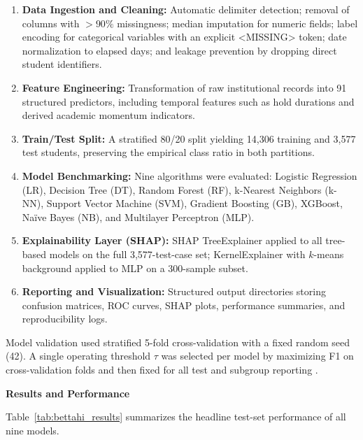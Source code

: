 \documentclass[12pt]{report}
\begin{document}
\begin{enumerate}
    \item \textbf{Data Ingestion and Cleaning:} Automatic delimiter
    detection; removal of columns with $>90\%$ missingness; median
    imputation for numeric fields; label encoding for categorical variables
    with an explicit <MISSING> token; date normalization to
    elapsed days; and leakage prevention by dropping direct student
    identifiers.

    \item \textbf{Feature Engineering:} Transformation of raw institutional
    records into 91 structured predictors, including temporal features such
    as hold durations and derived academic momentum indicators.

    \item \textbf{Train/Test Split:} A stratified 80/20 split yielding
    14,306 training and 3,577 test students, preserving the empirical
    class ratio in both partitions.

    \item \textbf{Model Benchmarking:} Nine algorithms were evaluated:
    Logistic Regression (LR), Decision Tree (DT), Random Forest (RF),
    k-Nearest Neighbors (k-NN), Support Vector Machine (SVM), Gradient
    Boosting (GB), XGBoost, Na\"{i}ve Bayes (NB), and Multilayer
    Perceptron (MLP).

    \item \textbf{Explainability Layer (SHAP):} SHAP TreeExplainer
    applied to all tree-based models on the full 3,577-test-case set;
    KernelExplainer with $k$-means background applied to
    MLP on a 300-sample subset.

    \item \textbf{Reporting and Visualization:} Structured output
    directories storing confusion matrices, ROC curves, SHAP plots,
    performance summaries, and reproducibility logs.
\end{enumerate}

Model validation used stratified 5-fold cross-validation with a fixed
random seed (42). A single operating threshold $\tau$ was selected per
model by maximizing F1 on cross-validation folds and then fixed for
all test and subgroup reporting \parencite{bettahi2025}.

\textbf{Results and Performance}

Table~\ref{tab:bettahi_results} summarizes the headline test-set
performance of all nine models.
\end{document}
